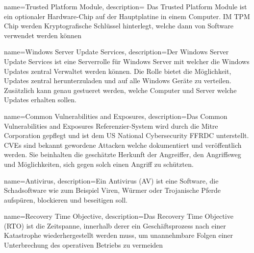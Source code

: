 {
    name=Trusted Platform Module,
    description={
            Das Trusted Platform Module ist ein optionaler Hardware-Chip auf der Hauptplatine in einem Computer. IM TPM Chip werden Kryptografische Schlüssel hinterlegt, welche dann von Software verwendet werden können
        }
}

{
    name=Windows Server Update Services,
    description={Der Windows Server Update Services ist eine Serverrolle für Windows Server mit welcher die Windows Updates zentral Verwaltet werden können.
            Die Rolle bietet die Möglichkeit, Updates zentral herunterzuladen und auf alle Windows Geräte zu verteilen.
            Zusätzlich kann genau gestueret werden, welche Computer und Server welche Updates erhalten sollen.}
}

{
    name=Common Vulnerabilities and Exposures,
    description={Das Common Vulnerabilities and Exposures Referenzier-System wird durch die Mitre Corporation gepflegt und ist dem US National Cybersecurity FFRDC unterstellt.
            CVEs sind bekannt gewordene Attacken welche dokumentiert und veröffentlich werden.
            Sie beinhalten die geschätzte Herkunft der Angreiffer, den Angriffsweg und Möglichkeiten, sich gegen solch einen Angriff zu schützten.
        }
}

{
    name=Antivirus,
    description={Ein Antivirus (AV) ist eine Software, die Schadsoftware wie zum Beispiel Viren, Würmer oder Trojanische Pferde aufspüren, blockieren und beseitigen soll.}
}

{
    name=Recovery Time Objective,
    description={Das Recovery Time Objective (RTO) ist die Zeitspanne, innerhalb derer ein Geschäftsprozess nach einer Katastrophe wiederhergestellt werden muss, um unannehmbare Folgen einer Unterbrechung des operativen Betriebs zu vermeiden}
}
